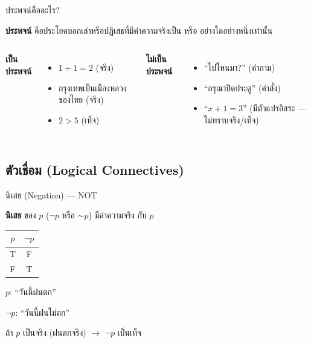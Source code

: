 \documentclass[11pt, aspectratio=169]{beamer}
\begin{document}
\begin{frame}{ประพจน์คืออะไร?}
  \begin{explanation}
    \textbf{ประพจน์} คือประโยคบอกเล่าหรือปฏิเสธที่มีค่าความจริงเป็น  หรือ  อย่างใดอย่างหนึ่งเท่านั้น
  \end{explanation}

  \begin{columns}[T]
      \textbf{เป็นประพจน์}
      \begin{itemize}
        \item $1 + 1 = 2$ \quad (จริง)
        \item กรุงเทพเป็นเมืองหลวงของไทย \quad (จริง)
        \item $2 > 5$ \quad (เท็จ)
      \end{itemize}

      \textbf{ไม่เป็นประพจน์}
      \begin{itemize}
        \item ``ไปไหนมา?'' (คำถาม)
        \item ``กรุณาปิดประตู'' (คำสั่ง)
        \item ``$x + 1 = 3$'' (มีตัวแปรอิสระ — ไม่ทราบจริง/เท็จ)
      \end{itemize}
  \end{columns}
\end{frame}

\subsection{ตัวเชื่อม (Logical Connectives)}

\begin{frame}{นิเสธ (Negation) — NOT}
  \begin{explanation}[นิยาม]
    \textbf{นิเสธ} ของ $p$ ($\lnot p$ หรือ $\sim p$) มีค่าความจริง กับ $p$

    \medskip
    \begin{center}
      \begin{tabular}{c|c}
        $p$ & $\lnot p$ \\
        \hline
        T & F \\
        F & T
      \end{tabular}
    \end{center}
  \end{explanation}

  \begin{exambox}[ตัวอย่าง]
    $p$: ``วันนี้ฝนตก''

    $\lnot p$: ``วันนี้ฝนไม่ตก''

    \medskip
    ถ้า $p$ เป็นจริง (ฝนตกจริง) $\rightarrow$ $\lnot p$ เป็นเท็จ
  \end{exambox}
\end{frame}
\end{document}
